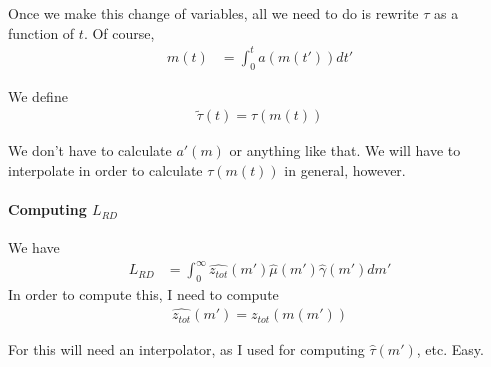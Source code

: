 \documentclass[12pt,english]{article}
\theoremstyle{remark}
\begin{document}
Once we make this change of variables, all we need to do is rewrite $\tau$ as a function of $t$. Of course,
\begin{align*}
	m(t) &= \int_0^t a(m(t')) dt'
\end{align*}

We define
\begin{align*}
	\tilde{\tau}(t) = \tau(m(t))
\end{align*}

We don't have to calculate $a'(m)$ or anything like that. We will have to interpolate in order to calculate $\tau(m(t))$ in general, however. 

\paragraph{Computing $L_{RD}$}
We have
\begin{align*}
	L_{RD} &= \int_0^{\infty} \hat{z_{tot}}(m') \hat{\mu}(m') \hat{\gamma}(m') dm' 
\end{align*}
In order to compute this, I need to compute
\begin{align*}
	\hat{z_{tot}}(m') = z_{tot}(m(m'))
\end{align*}

For this will need an interpolator, as I used for computing $\hat{\tau}(m')$, etc. Easy.
\end{document}
